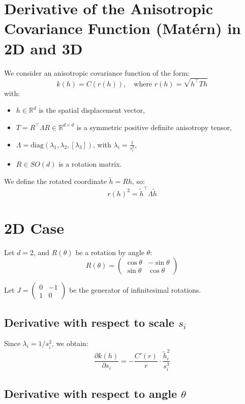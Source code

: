 \documentclass{article}
\begin{document}
\section*{Derivative of the Anisotropic Covariance Function (Matérn) in 2D and 3D}

We consider an anisotropic covariance function of the form:
\[
k(h) = C\left( r(h) \right), \quad \text{where } r(h) = \sqrt{h^\top T h}
\]
with:
\begin{itemize}
  \item \( h \in \mathbb{R}^d \) is the spatial displacement vector,
  \item \( T = R^\top \Lambda R \in \mathbb{R}^{d \times d} \) is a symmetric positive definite anisotropy tensor,
  \item \( \Lambda = \mathrm{diag}(\lambda_1, \lambda_2, [\lambda_3]) \), with \( \lambda_i = \frac{1}{s_i^2} \),
  \item \( R \in SO(d) \) is a rotation matrix.
\end{itemize}

We define the rotated coordinate \( \tilde{h} = R h \), so:
\[
r(h)^2 = \tilde{h}^\top \Lambda \tilde{h}
\]

\section*{2D Case}

Let \( d = 2 \), and \( R(\theta) \) be a rotation by angle \( \theta \):
\[
R(\theta) = \begin{pmatrix}
\cos\theta & -\sin\theta \\
\sin\theta & \cos\theta
\end{pmatrix}
\]

Let \( J = \begin{pmatrix} 0 & -1 \\ 1 & 0 \end{pmatrix} \) be the generator of infinitesimal rotations.

\subsection*{Derivative with respect to scale \( s_i \)}

Since \( \lambda_i = 1/s_i^2 \), we obtain:
\[
\frac{\partial k(h)}{\partial s_i} = - \frac{C'(r)}{r} \cdot \frac{\tilde{h}_i^2}{s_i^3}
\]

\subsection*{Derivative with respect to angle \( \theta \)}
\end{document}
